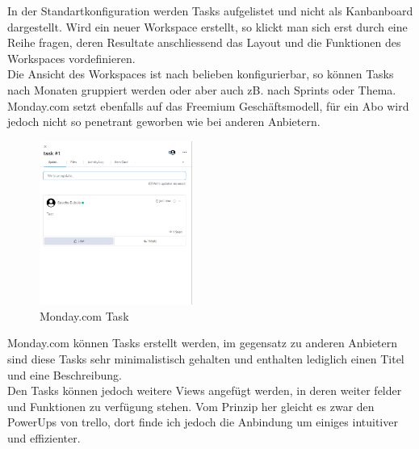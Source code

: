 In der Standartkonfiguration werden Tasks aufgelistet und nicht als Kanbanboard dargestellt.
Wird ein neuer Workspace erstellt, so klickt man sich erst durch eine Reihe fragen, deren Resultate anschliessend das Layout und die Funktionen
des Workspaces vordefinieren.\\
Die Ansicht des Workspaces ist nach belieben konfigurierbar, so können  Tasks nach Monaten gruppiert werden oder aber auch zB. nach Sprints oder Thema.
Monday.com setzt ebenfalls auf das Freemium Geschäftsmodell, für ein Abo wird jedoch nicht so penetrant geworben wie bei anderen Anbietern.\\
\space
\begin{figure}
    \begin{center}
        \includegraphics[width=5cm]{../content/images/monday.com/MondayTask.png}
        \caption{Monday.com Task}
    \end{center}
\end{figure}

Monday.com können Tasks erstellt werden, im gegensatz zu anderen Anbietern sind diese Tasks
sehr minimalistisch gehalten und enthalten lediglich einen Titel und eine Beschreibung.\\
Den Tasks können jedoch weitere Views angefügt werden, in deren weiter felder und Funktionen zu verfügung stehen.
Vom Prinzip her gleicht es zwar den PowerUps von trello, dort finde ich jedoch die Anbindung um einiges
intuitiver und effizienter.\\

